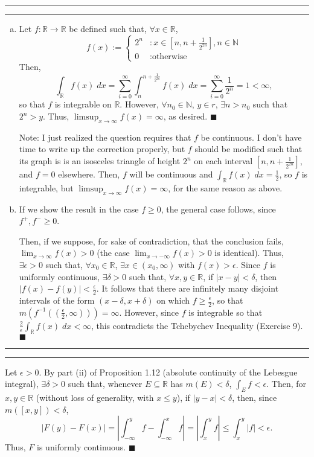 \documentclass[11pt]{article}
\newcounter{questionCounter}
\newcounter{partCounter}[questionCounter]
\newenvironment{question}[2][\arabic{questionCounter}]{%
    \setcounter{partCounter}{0}%
    \vspace{.25in} \hrule \vspace{0.5em}%
        \noindent{\bf #2}%
    \vspace{0.8em} \hrule \vspace{.10in}%
    \addtocounter{questionCounter}{1}%
}{}
\renewcommand{\qed}{\quad $\blacksquare$}
\newcommand{\inv}{^{-1}}
\newcommand{\N}{\mathbb{N}} %
\newcommand{\R}{\mathbb{R}} %
\begin{document}
\begin{question}{Exercise 6}
\begin{enumerate}[(a)]
\item Let $f : \R \rightarrow \R$ be defined such that, $\forall x \in \R$,
\[
    f(x)
 := \left \{
        \begin{array}{cl}
            2^n & : x \in \left[ n, n + \frac{1}{2^{2n}} \right], n \in \N\\
            0   & : \mbox{otherwise}
        \end{array}
    \right.
\]
Then,
\[
   \int_{\R} f(x) \; dx
 = \sum_{i = 0}^{\infty} \int_n^{n + \frac{1}{2^{2n}}} f(x) \; dx
 = \sum_{i = 0}^{\infty} \frac{1}{2^n}
 = 1
 < \infty,
\]
so that $f$ is integrable on $\R$. However, $\forall n_0 \in \N$, $y \in r$,
$\exists n > n_0$ such that $2^n > y$. Thus,
$\limsup_{x \rightarrow \infty} f(x) = \infty$, as desired. \qed

Note: I just realized the question requires that $f$ be continuous. I don't
have time to write up the correction properly, but $f$ should be modified such
that its graph is is an isosceles triangle of height $2^n$ on each interval
$\left[ n, n + \frac{1}{2^{2n}} \right]$, and $f = 0$ elsewhere. Then, $f$
will be continuous and $\int_{\R} f(x) \; dx = \frac12$, so $f$ is integrable,
but $\limsup_{x \rightarrow \infty} f(x) = \infty$, for the same reason as
above.

\item If we show the result in the case $f \geq 0$, the general case follows,
since $f^+,f^- \geq 0$.

Then, if we suppose, for sake of contradiction, that
the conclusion fails, $\lim_{x \rightarrow \infty} f(x) > 0$ (the case
$\lim_{x \rightarrow -\infty} f(x) > 0$ is identical). Thus,
$\exists \epsilon > 0$ such that, $\forall x_0 \in \R$,
$\exists x \in (x_0,\infty)$ with $f(x) > \epsilon$. Since $f$ is uniformly
continuous, $\exists \delta > 0$ such that, $\forall x,y \in \R$, if
$|x - y| < \delta$, then $|f(x) - f(y)| < \frac{\epsilon}{2}$. It follows that
there are infinitely many disjoint intervals of the form
$(x - \delta, x + \delta)$ on which $f \geq \frac{\epsilon}{2}$, so that
$m(f\inv((\frac{\epsilon}{2}, \infty))) = \infty$. However, since $f$ is
integrable so that $\frac{2}{\epsilon} \int_{\R} f(x) \; dx < \infty$, this
contradicts the Tchebychev Inequality (Exercise 9). \qed
\end{enumerate}
\end{question}

\begin{question}{Exercise 8}
Let $\epsilon > 0$. By part (ii) of Proposition 1.12 (absolute continuity of
the Lebesgue integral), $\exists \delta > 0$ such that, whenever
$E \subseteq \R$ has $m(E) < \delta$, $\int_E f < \epsilon$. Then, for
$x,y \in \R$ (without loss of generality, with $x \leq y$), if
$|y - x| < \delta$, then, since $m([x,y]) < \delta$,
\[
|F(y) - F(x)|
 =    \left| \int_{-\infty}^y f - \int_{-\infty}^x f \right|
 =    \left| \int_x^y f \right|
 \leq \int_x^y \left| f \right|
 <    \epsilon.
\]
Thus, $F$ is uniformly continuous. \qed
\end{question}
\end{document}
